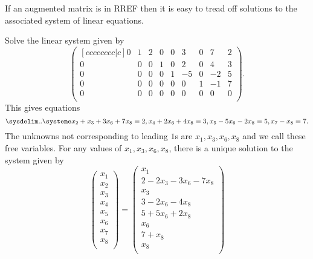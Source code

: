 If an augmented matrix is in RREF then it is easy to tread off solutions to the associated system of linear equations.

\begin{example}
    Solve the linear system given by
    \[
        \begin{pmatrix}[cccccccc|c]
            0&1&2&0&0&3&0&7&2\\
            0&0&0&1&0&2&0&4&3\\
            0&0&0&0&1&-5&0&-2&5\\
            0&0&0&0&0&0&1&-1&7\\
            0&0&0&0&0&0&0&0&0\\
        \end{pmatrix}
        .
    \]
    This gives equations
    \[
        \linsys{
            x_2+x_3+3x_6+7x_8=2,
            x_4+2x_6+4x_8=3,
            x_5-5x_6-2x_8=5,
            x_7-x_8=7
        }
        .
    \]
    The unknowns not corresponding to leading $1$s are $x_1,x_3,x_6,x_8$ and we call these free variables. For any values of $x_1,x_3,x_6,x_8$, there is a unique solution to the system given by
    \[
        \begin{pmatrix}
            x_1\\x_2\\x_3\\x_4\\x_5\\x_6\\x_7\\x_8\\
        \end{pmatrix}
        =
        \begin{pmatrix}
            x_1\\
            2-2x_3-3x_6-7x_8\\
            x_3\\
            3-2x_6-4x_8\\
            5+5x_6+2x_8\\
            x_6\\
            7+x_8\\
            x_8\\
        \end{pmatrix}
    \]
\end{example}

